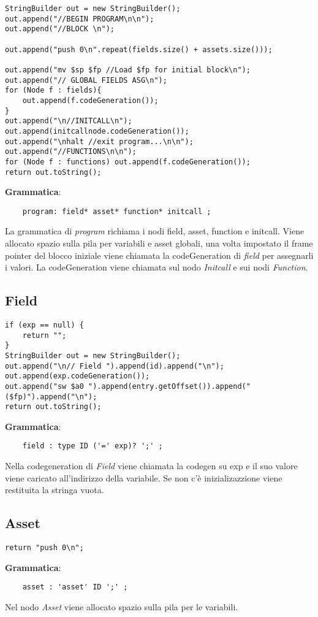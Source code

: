 \documentclass[12pt,twoside,openright,a4paper]{report}
\begin{document}
\begin{lstlisting}
StringBuilder out = new StringBuilder();
out.append("//BEGIN PROGRAM\n\n");
out.append("//BLOCK \n");

out.append("push 0\n".repeat(fields.size() + assets.size()));

out.append("mv $sp $fp //Load $fp for initial block\n");
out.append("// GLOBAL FIELDS ASG\n");
for (Node f : fields){
	out.append(f.codeGeneration());
}
out.append("\n//INITCALL\n");
out.append(initcallnode.codeGeneration());
out.append("\nhalt //exit program...\n\n");
out.append("//FUNCTIONS\n\n");
for (Node f : functions) out.append(f.codeGeneration());
return out.toString();
\end{lstlisting}
\textbf{Grammatica}: 
\begin{lstlisting}
    program: field* asset* function* initcall ;
\end{lstlisting}
La grammatica di \textit{program} richiama i nodi field, asset, function e initcall.
Viene allocato spazio sulla pila per variabili e asset globali, una volta impostato il frame pointer del blocco iniziale viene chiamata la codeGeneration di \textit{field} per assegnarli i valori. 
La codeGeneration viene chiamata sul nodo \textit{Initcall} e sui nodi \textit{Function}.

\newpage
\subsection{Field}
\begin{lstlisting}
if (exp == null) {
	return "";
}
StringBuilder out = new StringBuilder();
out.append("\n// Field ").append(id).append("\n");
out.append(exp.codeGeneration());
out.append("sw $a0 ").append(entry.getOffset()).append("($fp)").append("\n");
return out.toString();
\end{lstlisting}
\textbf{Grammatica}: 
\begin{lstlisting} 
    field : type ID ('=' exp)? ';' ;
\end{lstlisting}
Nella codegeneration di \textit{Field} viene chiamata la codegen su exp e il suo valore viene caricato all'indirizzo della variabile. Se non c'è inizializazzione viene restituita la stringa vuota.

\subsection{Asset}
\begin{lstlisting}
return "push 0\n";
\end{lstlisting}
\textbf{Grammatica}: 
\begin{lstlisting}
    asset : 'asset' ID ';' ;
\end{lstlisting}
Nel nodo \textit{Asset} viene allocato spazio sulla pila per le variabili.
\end{document}
